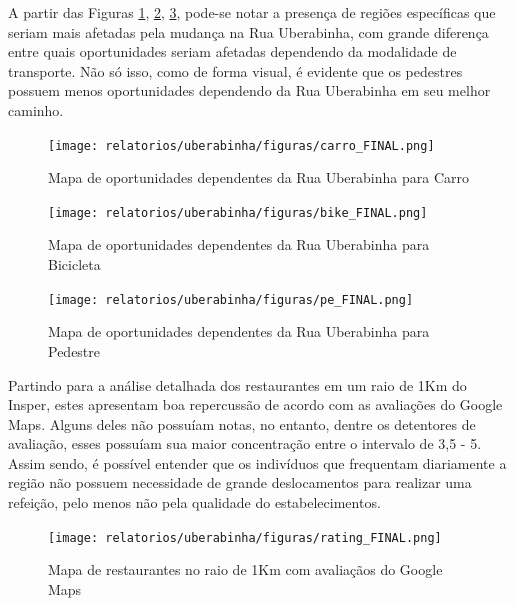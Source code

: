 A partir das Figuras \ref{fig:oportunidades_carro}, \ref{fig:oportunidades_bike}, \ref{fig:oportunidades_pe}, pode-se notar a presença de regiões específicas que seriam mais afetadas pela mudança na Rua Uberabinha, com grande diferença entre quais oportunidades seriam afetadas dependendo da modalidade de transporte. Não só isso, como de forma visual, é evidente que os pedestres possuem menos oportunidades dependendo da Rua Uberabinha em seu melhor caminho.

\begin{figure}[H]
    \centering
    \caption{Mapa de oportunidades dependentes da Rua Uberabinha para Carro}
    \texttt{[image: relatorios/uberabinha/figuras/carro\_FINAL.png]}
    \label{fig:oportunidades_carro}
\end{figure}

\begin{figure}[H]
    \centering
    \caption{Mapa de oportunidades dependentes da Rua Uberabinha para Bicicleta}
    \texttt{[image: relatorios/uberabinha/figuras/bike\_FINAL.png]}
    \label{fig:oportunidades_bike}
\end{figure}

\begin{figure}[H]
    \centering
    \caption{Mapa de oportunidades dependentes da Rua Uberabinha para Pedestre}
    \texttt{[image: relatorios/uberabinha/figuras/pe\_FINAL.png]}
    \label{fig:oportunidades_pe}
\end{figure}

Partindo para a análise detalhada dos restaurantes em um raio de 1Km do Insper, estes apresentam boa repercussão de acordo com as avaliações do Google Maps. Alguns deles não possuíam notas, no entanto, dentre os detentores de avaliação, esses possuíam sua maior concentração entre o intervalo de 3,5 - 5. Assim sendo, é possível entender que os indivíduos que frequentam diariamente a região não possuem necessidade de grande deslocamentos para realizar uma refeição, pelo menos não pela qualidade do estabelecimentos.

\begin{figure}[H]
    \centering
    \caption{Mapa de restaurantes no raio de 1Km com avaliaçãos do Google Maps}
    \texttt{[image: relatorios/uberabinha/figuras/rating\_FINAL.png]}
    \label{fig:rating}
\end{figure}

